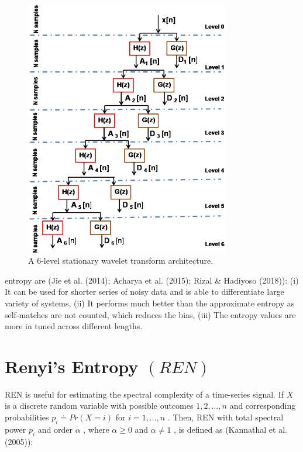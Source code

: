 \documentclass{article}
\begin{document}
\begin{figure}[htbp]
\centering
\includegraphics[width=0.8\textwidth]{images/bdc0ca10bcfc62f524c3777c4b29c1e9cf0fd8c2601ee9fd91c8da1eef1be617.jpg}
\caption{A 6-level stationary wavelet transform architecture.}
\end{figure}


entropy are (Jie et al. (2014); Acharya et al. (2015); Rizal & Hadiyoso (2018)): (i) It can be used for shorter series of noisy data and is able to differentiate large variety of systems, (ii) It performs much better than the approximate entropy as self-matches are not counted, which reduces the bias, (iii) The entropy values are more in tuned across different lengths.


\section{Renyi’s Entropy $(R E N)$}


REN is useful for estimating the spectral complexity of a time-series signal. If $X$ is a discrete random variable with possible outcomes $1,2,\ldots,n$ and corresponding probabilities $p_{i}\doteq P r(X=i)$ for $i=1,\ldots,n$ . Then, REN with total spectral power $p_{i}$ and order $\alpha$ , where $\alpha\geq0$ and $\alpha\neq1$ , is defined as (Kannathal et al. (2005)):
\end{document}
